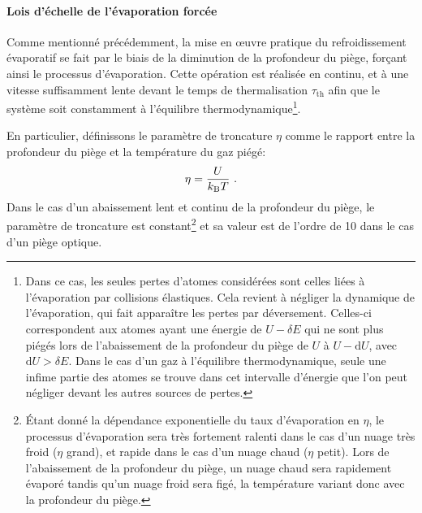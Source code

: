 \paragraph*{Lois d'échelle de l'évaporation forcée}
Comme mentionné précédemment, la mise en œuvre pratique du refroidissement évaporatif se fait par le biais de la diminution de la profondeur du piège, forçant ainsi le processus d'évaporation. Cette opération est réalisée en continu, et à une vitesse suffisamment lente devant le temps de thermalisation $\tau_{\mathrm{th}}$ afin que le système soit constamment à l'équilibre thermodynamique\footnote{Dans ce cas, les seules pertes d'atomes considérées sont celles liées à l'évaporation par collisions élastiques. Cela revient à négliger la dynamique de l'évaporation, qui fait apparaître les pertes par déversement\citep{cohen1996atomes}. Celles-ci correspondent aux atomes ayant une énergie de $U-\delta E$ qui ne sont plus piégés lors de l'abaissement de la profondeur du piège de $U$ à $U-\mathrm{d}U$, avec $\mathrm{d}U > \delta E$. Dans le cas d'un gaz à l'équilibre thermodynamique, seule une infime partie des atomes se trouve dans cet intervalle d'énergie que l'on peut négliger devant les autres sources de pertes.}. 


En particulier, définissons le paramètre de troncature $\eta$ comme le rapport entre la profondeur du piège et la température du gaz piégé:
\begin{equation}
\eta=\frac{U}{k_{\mathrm{B}} T} \text{ .}
\end{equation}
Dans le cas d'un abaissement lent et continu de la profondeur du piège, le paramètre de troncature est constant\footnote{Étant donné la dépendance exponentielle du taux d'évaporation en $\eta$, le processus d'évaporation sera très fortement ralenti dans le cas d'un nuage très froid ($\eta$ grand), et rapide dans le cas d'un nuage chaud ($\eta$ petit). Lors de l'abaissement de la profondeur du piège, un nuage chaud sera rapidement évaporé tandis qu'un nuage froid sera figé, la température variant donc avec la profondeur du piège.} et sa valeur est de l'ordre de 10 dans le cas d'un piège optique.



